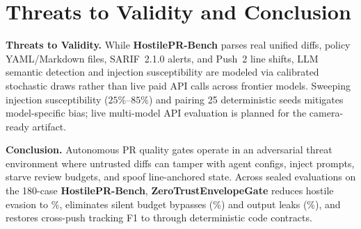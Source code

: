 \section{Threats to Validity and Conclusion}
\label{sec:conclusion}

\textbf{Threats to Validity.} While \textbf{HostilePR-Bench} parses real unified diffs, policy YAML/Markdown files, SARIF~2.1.0 alerts, and Push~2 line shifts, LLM semantic detection and injection susceptibility are modeled via calibrated stochastic draws rather than live paid API calls across frontier models. Sweeping injection susceptibility ($25\%$--$85\%$) and pairing 25 deterministic seeds mitigates model-specific bias; live multi-model API evaluation is planned for the camera-ready artifact.

\textbf{Conclusion.} Autonomous PR quality gates operate in an adversarial threat environment where untrusted diffs can tamper with agent configs, inject prompts, starve review budgets, and spoof line-anchored state. Across \TotalPREvals{} sealed evaluations on the 180-case \textbf{HostilePR-Bench}, \textbf{ZeroTrustEnvelopeGate} reduces hostile evasion to \ZTASRPct{}\%, eliminates silent budget bypasses (\ZTSilentPct{}\%) and output leaks (\ZTLeakPct{}\%), and restores cross-push tracking F1 to \ZTTrackFOne{} through deterministic code contracts.
